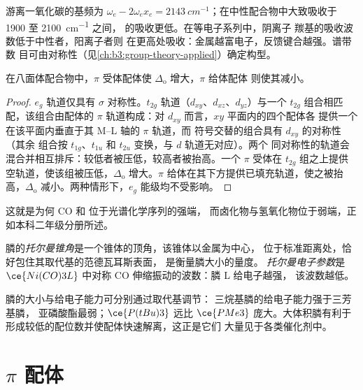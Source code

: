 游离一氧化碳的基频为 $\omega_e - 2\omega_ex_e = \qty{2143}{cm^{-1}}$；在中性配合物中大致吸收于 1900 至 \qty{2100}{cm^{-1}} 之间，
的吸收更低。在等电子系列中，阴离子
羰基的吸收波数低于中性者，阳离子者则
在更高处吸收：金属越富电子，反馈键合越强。谱带数
目可由对称性（见\cref{ch:b3:group-theory-applied}）确定构型。

\begin{proposition}[$\pi$ 相互作用与配体场分裂]\label{prop:b3:organometallic-bonding:pi-delta}
在八面体配合物中，$\pi$ 受体配体使 $\Delta_{\mathrm o}$ 增大，$\pi$ 给体配体
则使其减小。
\end{proposition}

\begin{proof}
$e_g$ 轨道仅具有 $\sigma$ 对称性。$t_{2g}$ 轨道（$d_{xy}$、$d_{xz}$、$d_{yz}$）与一个 $t_{2g}$
组合相匹配，该组合由配体的 $\pi$ 轨道构成：对 $d_{xy}$ 而言，$xy$ 平面内的四个配体各
提供一个在该平面内垂直于其 M--L 轴的 $\pi$ 轨道，而
符号交替的组合具有 $d_{xy}$ 的对称性（其余
组合按 $t_{1g}$、$t_{1u}$ 和 $t_{2u}$ 变换，与 $d$ 轨道无对应）。两个
同对称性的轨道会混合并相互排斥：较低者被压低，较高者被抬高。一个
$\pi$ 受体在 $t_{2g}$ 组之上提供空轨道，使该组被压低，$\Delta_{\mathrm o}$
增大。$\pi$ 给体在其下方提供已填充轨道，使之被抬高，$\Delta_{\mathrm o}$
减小。两种情形下，$e_g$ 能级均不受影响。
\end{proof}

这就是为何 CO 和  位于光谱化学序列的强端，
而卤化物与氢氧化物位于弱端，正如本科二年级分册所述。

\begin{definition}[托尔曼参数]\label{def:b3:organometallic-bonding:tolman}
膦的\emph{托尔曼锥角}是一个锥体的顶角，该锥体以金属为中心，
位于标准距离处，恰好包住其取代基的范德瓦耳斯表面，
是衡量膦大小的量度。
\emph{托尔曼电子参数}是
$\ce{Ni(CO)3L}$ 中对称 CO 伸缩振动的波数：膦 L 给电子越强，
该波数越低。
\end{definition}

膦的大小与给电子能力可分别通过取代基调节：
三烷基膦的给电子能力强于三芳基膦，
亚磷酸酯最弱；$\ce{P(tBu)3}$ 远比 $\ce{PMe3}$ 庞大。大体积膦有利于
形成较低的配位数并使配体快速解离，这正是它们
大量见于各类催化剂中。

\section{$\pi$ 配体}

